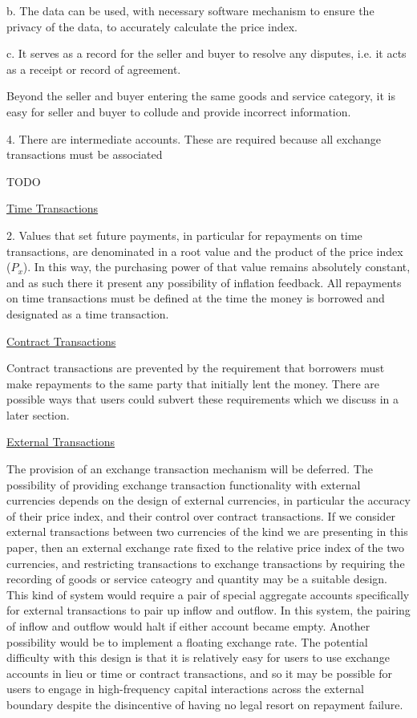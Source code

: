 b. The data can be used, with necessary software mechanism to ensure the privacy of the data, to
accurately calculate the price index. 

c. It serves as a record for the seller and buyer to resolve any disputes, i.e. it acts as a
receipt or record of agreement.

Beyond the seller and buyer entering the same goods and service category, it is easy for seller and
buyer to collude and provide incorrect information.

4. There are intermediate accounts. These are required because all exchange transactions must be
associated

TODO

\underline{Time Transactions}

2. Values that set future payments, in particular for repayments on time transactions, are
denominated in a root value and the product of the price index ($P_x$). In this way, the purchasing
power of that value remains absolutely constant, and as such there it present any possibility of
inflation feedback. All repayments on time transactions must be defined at the time the money is
borrowed and designated as a time transaction.

\underline{Contract Transactions}

Contract transactions are prevented by the requirement that borrowers must make repayments to the
same party that initially lent the money. There are possible ways that users could subvert these
requirements which we discuss in a later section.

\underline{External Transactions}

The provision of an exchange transaction mechanism will be deferred. The possibility of providing
exchange transaction functionality with external currencies depends on the design of external
currencies, in particular the accuracy of their price index, and their control over contract
transactions. If we consider external transactions between two currencies of the kind we are
presenting in this paper, then an external exchange rate fixed to the relative price index of the
two currencies, and restricting transactions to exchange transactions by requiring the recording of
goods or service cateogry and quantity may be a suitable design. This kind of system would require a
pair of special aggregate accounts specifically for external transactions to pair up inflow and
outflow. In this system, the pairing of inflow and outflow would halt if either account became
empty. Another possibility would be to implement a floating exchange rate. The potential difficulty
with this design is that it is relatively easy for users to use exchange accounts in lieu or time or
contract transactions, and so it may be possible for users to engage in high-frequency capital
interactions across the external boundary despite the disincentive of having no legal resort on
repayment failure.

